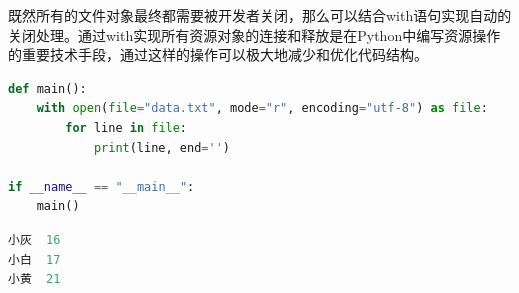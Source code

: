 \begin{table}[H]
	\centering
	\caption{文件读写方法}
\end{table}

既然所有的文件对象最终都需要被开发者关闭，那么可以结合with语句实现自动的关闭处理。通过with实现所有资源对象的连接和释放是在Python中编写资源操作的重要技术手段，通过这样的操作可以极大地减少和优化代码结构。 \\

\begin{lstlisting}[language=Python, title=读取文件]
def main():
    with open(file="data.txt", mode="r", encoding="utf-8") as file:
        for line in file:
            print(line, end='')

if __name__ == "__main__":
    main()
\end{lstlisting}

\begin{lstlisting}[language=Python, title=data.txt]
小灰	16
小白	17
小黄	21
\end{lstlisting}

